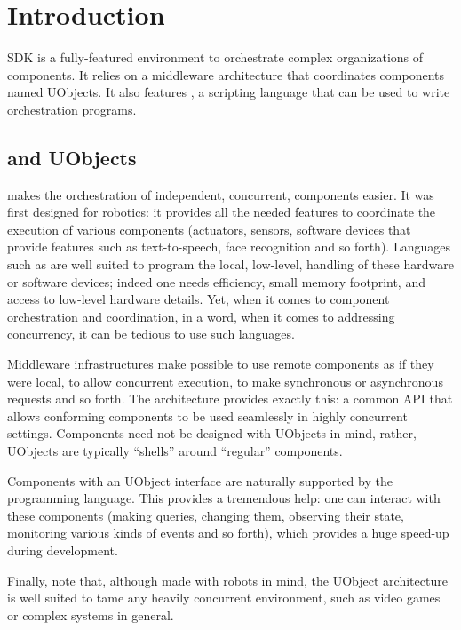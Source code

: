 \chapter{Introduction}

\urbi SDK is a fully-featured environment to orchestrate complex
organizations of components.  It relies on a middleware architecture
that coordinates components named UObjects.  It also features \us, a
scripting language that can be used to write orchestration programs.

\section{\urbi and UObjects}

\urbi makes the orchestration of independent, concurrent, components
easier.  It was first designed for robotics: it provides all the
needed features to coordinate the execution of various components
(actuators, sensors, software devices that provide features such as
text-to-speech, face recognition and so forth).  Languages such as
\Cxx are well suited to program the local, low-level, handling of
these hardware or software devices; indeed one needs efficiency, small
memory footprint, and access to low-level hardware details.  Yet, when
it comes to component orchestration and coordination, in a word, when
it comes to addressing concurrency, it can be tedious to use such
languages.

Middleware infrastructures make possible to use remote components as
if they were local, to allow concurrent execution, to make synchronous
or asynchronous requests and so forth.  The  \Cxx
architecture provides exactly this: a common API that allows
conforming components to be used seamlessly in highly concurrent
settings.  Components need not be designed with UObjects in mind,
rather, UObjects are typically ``shells'' around ``regular''
components.

Components with an UObject interface are naturally supported by the
\us programming language.  This provides a tremendous help: one can
interact with these components (making queries, changing them,
observing their state, monitoring various kinds of events and so
forth), which provides a huge speed-up during development.

Finally, note that, although made with robots in mind, the UObject
architecture is well suited to tame any heavily concurrent
environment, such as video games or complex systems in general.

